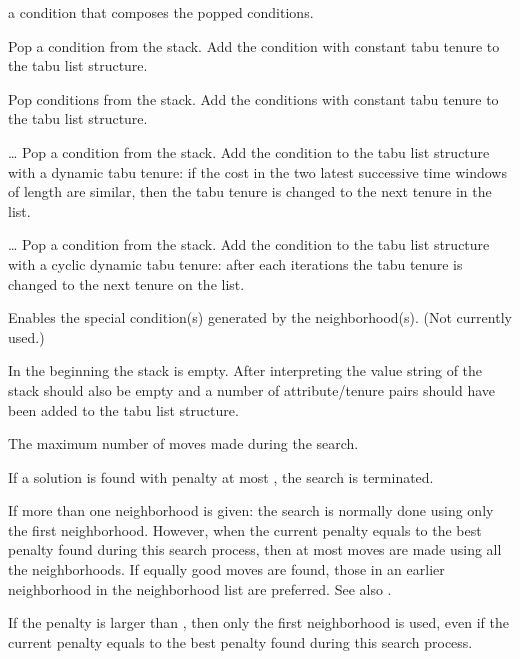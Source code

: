 \documentclass[12pt,a4paper]{article}
\begin{document}
\begin{owndescription}
\begin{owndescription}
    a condition that composes the popped conditions.
  \item[\Val{l} \Var{tl}] Pop a condition from the stack. Add the
    condition with constant tabu tenure  to the tabu list
    structure.
  \item[\Val{l} \Val{n} \Var{tls}] Pop  conditions from the
    stack. Add the conditions with constant tabu tenure  to the
    tabu list structure.
  \item[\Val{wl} \Var{dt} \Val{tl1} \Val{tl2}\ldots \Val{tlm}
    \Var{dtl}] Pop a condition from the stack. Add the condition to
    the tabu list structure with a dynamic tabu tenure: if the cost in
    the two latest successive time windows of length  are
    similar, then the tabu
    tenure is changed to the next tenure in the list.
  \item[\Val{cc} \Var{ct} \Val{tl1} \Val{tl2}\ldots \Val{tlm}
    \Var{ctl}] Pop a condition from the stack. Add the condition to
    the tabu list structure with a cyclic dynamic tabu tenure: after
    each  iterations the tabu tenure is changed to the next
    tenure on the list.
  \item[\Var{neigh}] Enables the special condition(s) generated by the
    neighborhood(s). (Not currently used.)
  \end{owndescription}
  In the beginning the stack is empty. After interpreting the value
  string of  the stack should also be empty and a number of
  attribute/tenure pairs should have been added to the tabu list
  structure.
\item[\Var{maxiter}] The maximum number of moves made during the
  search.
\item[\Var{endlimit}] If a solution is found with penalty at most
  , the search is terminated.
\item[\Var{largeremaining}] If more than one neighborhood is given:
  the search is normally done using only the first neighborhood.
  However, when the current penalty equals to the best penalty found
  during this search process, then at most  moves
  are made using all the neighborhoods. If equally good moves are
  found, those in an earlier neighborhood in the neighborhood list are
  preferred. See also .
\item[\Var{smallpenalty}] If the penalty is larger than
  , then only the first neighborhood is used, even
  if the current penalty equals to the best penalty found during this
  search process.
\end{owndescription}
\end{document}

